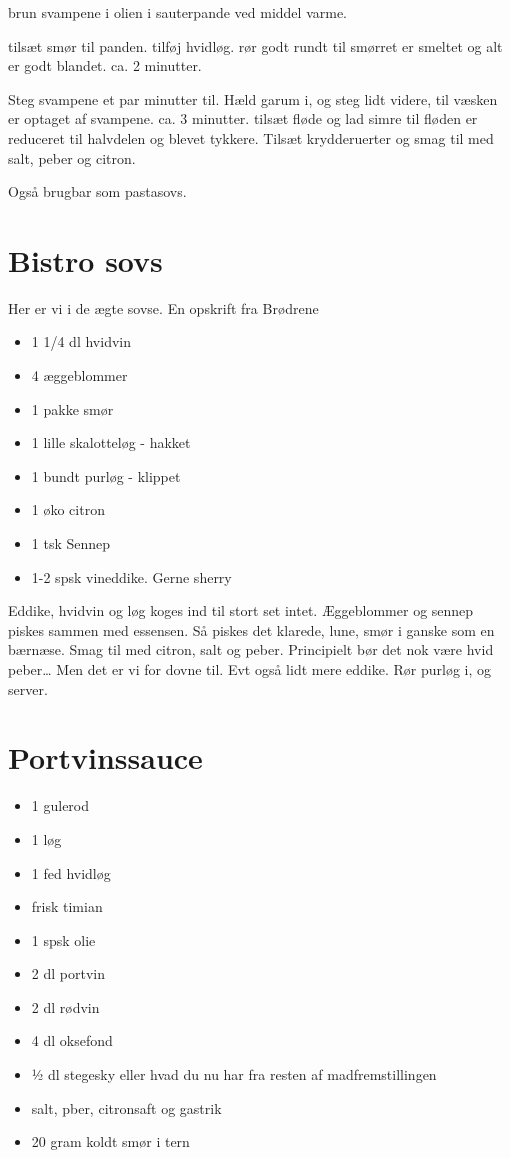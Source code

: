 \documentclass[
]{book}
\providecommand{\tightlist}{%
  \setlength{\itemsep}{0pt}\setlength{\parskip}{0pt}}
\begin{document}
brun svampene i olien i sauterpande ved middel varme.

tilsæt smør til panden. tilføj hvidløg. rør godt rundt til smørret er smeltet og alt er godt
blandet. ca. 2 minutter.

Steg svampene et par minutter til. Hæld garum i, og steg lidt videre, til
væsken er optaget af svampene. ca. 3 minutter.
tilsæt fløde og lad simre til fløden er reduceret til halvdelen og blevet tykkere.
Tilsæt krydderuerter og smag til med salt, peber og citron.

Også brugbar som pastasovs.

\section{Bistro sovs}\label{bistro-sovs}

Her er vi i de ægte sovse. En opskrift fra Brødrene

\begin{itemize}
\tightlist
\item
  1 1/4 dl hvidvin
\item
  4 æggeblommer
\item
  1 pakke smør
\item
  1 lille skalotteløg - hakket
\item
  1 bundt purløg - klippet
\item
  1 øko citron
\item
  1 tsk Sennep
\item
  1-2 spsk vineddike. Gerne sherry
\end{itemize}

Eddike, hvidvin og løg koges ind til stort set intet.
Æggeblommer og sennep piskes sammen med essensen. Så piskes det klarede,
lune, smør i ganske som en bærnæse. Smag til med citron, salt og peber.
Principielt bør det nok være hvid peber\ldots{} Men det er vi for dovne til.
Evt også lidt mere eddike.
Rør purløg i, og server.

\section{Portvinssauce}\label{portvinssauce}

\begin{itemize}
\tightlist
\item
  1 gulerod
\item
  1 løg
\item
  1 fed hvidløg
\item
  frisk timian
\item
  1 spsk olie
\item
  2 dl portvin
\item
  2 dl rødvin
\item
  4 dl oksefond
\item
  ½ dl stegesky eller hvad du nu har fra resten af madfremstillingen
\item
  salt, pber, citronsaft og gastrik
\item
  20 gram koldt smør i tern
\end{itemize}
\end{document}
